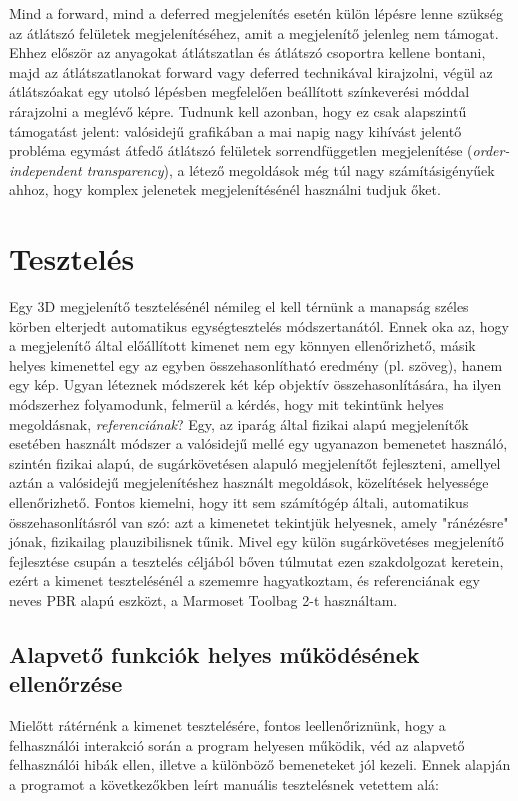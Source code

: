 Mind a forward, mind a deferred megjelenítés esetén külön lépésre lenne szükség az átlátszó felületek megjelenítéséhez, amit a megjelenítő jelenleg nem támogat. Ehhez először az anyagokat átlátszatlan és átlátszó csoportra kellene bontani, majd az átlátszatlanokat forward vagy deferred technikával kirajzolni, végül az átlátszóakat egy utolsó lépésben megfelelően beállított színkeverési móddal rárajzolni a meglévő képre. Tudnunk kell azonban, hogy ez csak alapszintű támogatást jelent: valósidejű grafikában a mai napig nagy kihívást jelentő probléma egymást átfedő átlátszó felületek sorrendfüggetlen megjelenítése (\textit{order-independent transparency}), a létező megoldások még túl nagy számításigényűek ahhoz, hogy komplex jelenetek megjelenítésénél használni tudjuk őket.

\section{Tesztelés}

Egy 3D megjelenítő tesztelésénél némileg el kell térnünk a manapság széles körben elterjedt automatikus egységtesztelés módszertanától. Ennek oka az, hogy a megjelenítő által előállított kimenet nem egy könnyen ellenőrizhető, másik helyes kimenettel egy az egyben összehasonlítható eredmény (pl. szöveg), hanem egy kép. Ugyan léteznek módszerek két kép objektív összehasonlítására, ha ilyen módszerhez folyamodunk, felmerül a kérdés, hogy mit tekintünk helyes megoldásnak, \textit{referenciának}? Egy, az iparág által fizikai alapú megjelenítők esetében használt módszer a valósidejű mellé egy ugyanazon bemenetet használó, szintén fizikai alapú, de sugárkövetésen alapuló megjelenítőt fejleszteni, amellyel aztán a valósidejű megjelenítéshez használt megoldások, közelítések helyessége ellenőrizhető. Fontos kiemelni, hogy itt sem számítógép általi, automatikus összehasonlításról van szó: azt a kimenetet tekintjük helyesnek, amely "ránézésre" jónak, fizikailag plauzibilisnek tűnik. Mivel egy külön sugárkövetéses megjelenítő fejlesztése csupán a tesztelés céljából bőven túlmutat ezen szakdolgozat keretein, ezért a kimenet tesztelésénél a szememre hagyatkoztam, és referenciának egy neves PBR alapú eszközt, a Marmoset Toolbag 2-t használtam.

\subsection{Alapvető funkciók helyes működésének ellenőrzése}

Mielőtt rátérnénk a kimenet tesztelésére, fontos leellenőriznünk, hogy a felhasználói interakció során a program helyesen működik, véd az alapvető felhasználói hibák ellen, illetve a különböző bemeneteket jól kezeli. Ennek alapján a programot a következőkben leírt manuális tesztelésnek vetettem alá:

